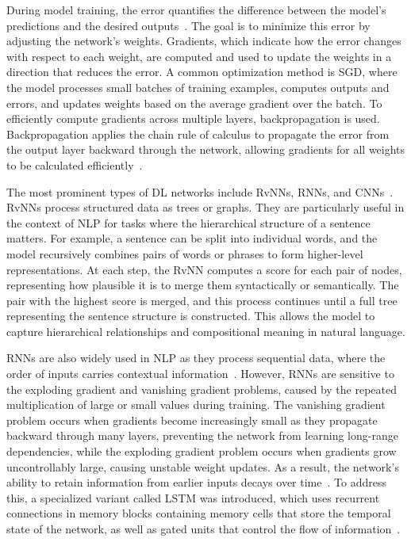 \documentclass[
english,                 %
bibtex,                  %
includeExtraAbstracts, %
]{kththesis}
\numberwithin{listing}{chapter}
\begin{document}
During model training, the error quantifies the difference between the model's predictions and the desired outputs~\cite{schmidhuber_deep_2015}. The goal is to minimize this error by adjusting the network's weights. Gradients, which indicate how the error changes with respect to each weight, are computed and used to update the weights in a direction that reduces the error. A common optimization method is \gls{SGD}, where the model processes small batches of training examples, computes outputs and errors, and updates weights based on the average gradient over the batch. To efficiently compute gradients across multiple layers, backpropagation is used. Backpropagation applies the chain rule of calculus to propagate the error from the output layer backward through the network, allowing gradients for all weights to be calculated efficiently~\cite{he_deep_2016}.

The most prominent types of \gls{DL} networks include \glspl{RvNN}, \glspl{RNN}, and \glspl{CNN}~\cite{alzubaidi_review_2021}. \Glspl{RvNN} process structured data as trees or graphs. They are particularly useful in the context of \gls{NLP} for tasks where the hierarchical structure of a sentence matters. For example, a sentence can be split into individual words, and the model recursively combines pairs of words or phrases to form higher-level representations. At each step, the \gls{RvNN} computes a score for each pair of nodes, representing how plausible it is to merge them syntactically or semantically. The pair with the highest score is merged, and this process continues until a full tree representing the sentence structure is constructed. This allows the model to capture hierarchical relationships and compositional meaning in natural language.

\Glspl{RNN} are also widely used in \gls{NLP} as they process sequential data, where the order of inputs carries contextual information~\cite{alzubaidi_review_2021}. However, \glspl{RNN} are sensitive to the exploding gradient and vanishing gradient problems, caused by the repeated multiplication of large or small values during training. The vanishing gradient problem occurs when gradients become increasingly small as they propagate backward through many layers, preventing the network from learning long-range dependencies, while the exploding gradient problem occurs when gradients grow uncontrollably large, causing unstable weight updates. As a result, the network's ability to retain information from earlier inputs decays over time~\cite{bengio_learning_1994}. To address this, a specialized variant called \gls{LSTM} was introduced, which uses recurrent connections in memory blocks containing memory cells that store the temporal state of the network, as well as gated units that control the flow of information~\cite{hochreiter_long_1997}.
\end{document}
